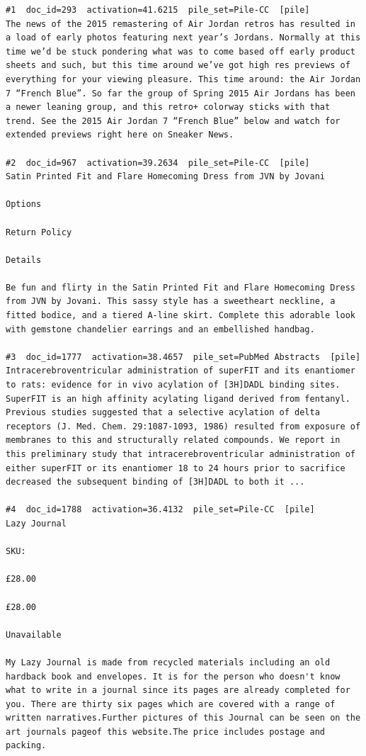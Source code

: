 \begin{verbatim}
#1  doc_id=293  activation=41.6215  pile_set=Pile-CC  [pile]
The news of the 2015 remastering of Air Jordan retros has resulted in a load of early photos featuring next year’s Jordans. Normally at this time we’d be stuck pondering what was to come based off early product sheets and such, but this time around we’ve got high res previews of everything for your viewing pleasure. This time around: the Air Jordan 7 “French Blue”. So far the group of Spring 2015 Air Jordans has been a newer leaning group, and this retro+ colorway sticks with that trend. See the 2015 Air Jordan 7 “French Blue” below and watch for extended previews right here on Sneaker News.

#2  doc_id=967  activation=39.2634  pile_set=Pile-CC  [pile]
Satin Printed Fit and Flare Homecoming Dress from JVN by Jovani

Options

Return Policy

Details

Be fun and flirty in the Satin Printed Fit and Flare Homecoming Dress from JVN by Jovani. This sassy style has a sweetheart neckline, a fitted bodice, and a tiered A-line skirt. Complete this adorable look with gemstone chandelier earrings and an embellished handbag.

#3  doc_id=1777  activation=38.4657  pile_set=PubMed Abstracts  [pile]
Intracerebroventricular administration of superFIT and its enantiomer to rats: evidence for in vivo acylation of [3H]DADL binding sites.
SuperFIT is an high affinity acylating ligand derived from fentanyl. Previous studies suggested that a selective acylation of delta receptors (J. Med. Chem. 29:1087-1093, 1986) resulted from exposure of membranes to this and structurally related compounds. We report in this preliminary study that intracerebroventricular administration of either superFIT or its enantiomer 18 to 24 hours prior to sacrifice decreased the subsequent binding of [3H]DADL to both it ...

#4  doc_id=1788  activation=36.4132  pile_set=Pile-CC  [pile]
Lazy Journal

SKU:

£28.00

£28.00

Unavailable

My Lazy Journal is made from recycled materials including an old hardback book and envelopes. It is for the person who doesn't know what to write in a journal since its pages are already completed for you. There are thirty six pages which are covered with a range of written narratives.Further pictures of this Journal can be seen on the art journals pageof this website.The price includes postage and packing.


\end{verbatim}
